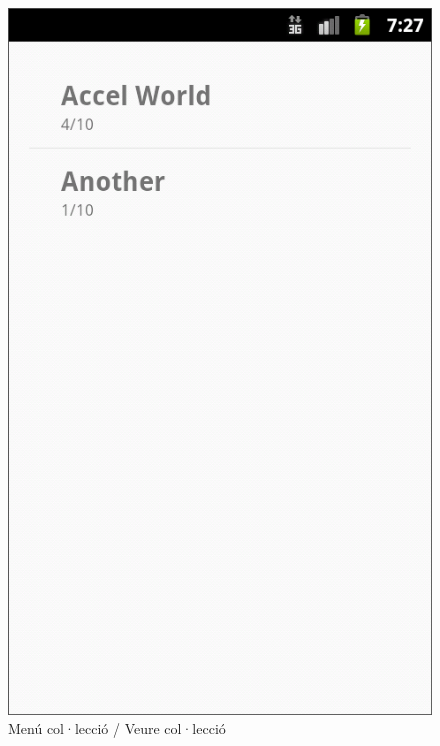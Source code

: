 \documentclass{beamer}
\begin{document}
\begin{frame}
\begin{figure}
			\includegraphics[scale=0.23]{collection.png}
			\caption{Menú col·lecció / Veure col·lecció}
		\end{figure}
	\end{frame}
\end{document}
